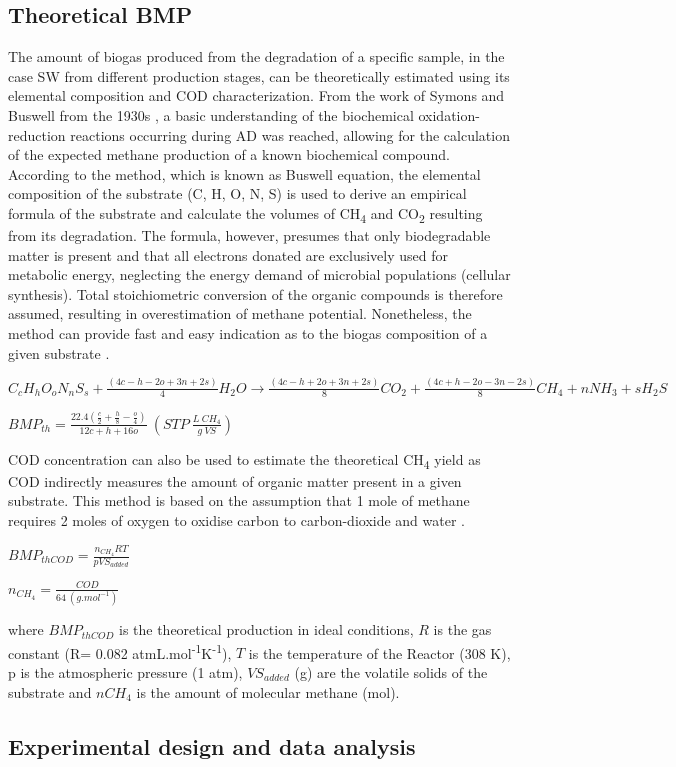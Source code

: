 \subsection{Theoretical BMP}
The amount of biogas produced from the degradation of a specific sample, in the case SW from different production stages, can be theoretically estimated using its elemental composition and COD characterization. From the work of Symons and Buswell from the 1930s \cite{Symons_1933}, a basic understanding of the biochemical oxidation-reduction reactions occurring during AD was reached, allowing for the calculation of the expected methane production of a known biochemical compound. According to the method, which is known as Buswell equation, the elemental composition of the substrate (C, H, O, N, S) is used to derive an empirical formula of the substrate and calculate the volumes of CH\textsubscript{4} and CO\textsubscript{2} resulting from its degradation. The formula, however, presumes that only biodegradable matter is present and that all electrons donated are exclusively used for metabolic energy, neglecting the energy demand of microbial populations (cellular synthesis)\cite{Labatut_2011,Lesteur_2010}. Total stoichiometric conversion of the organic compounds is therefore assumed, resulting in overestimation of methane potential. Nonetheless, the method can provide fast and easy indication as to the biogas composition of a given substrate \cite{Ware_2016}.

\(C_cH_hO_oN_nS_s+\frac{(4c-h-2o+3n+2s)}{4}H_2O→\frac{(4c-h+2o+3n+2s)}{8}CO_2+\frac{(4c+h-2o-3n-2s)}{8}CH_4+nNH_3+sH_2S\)

\(BMP_{th}=\frac{22.4\left(\frac{c}{2}+\frac{h}{8}-\frac{o}{4}\right)}{12c+h+16o}\ \left(STP\ \frac{L\ CH_4}{g\ VS}\right)\)

COD concentration can also be used to estimate the theoretical CH\textsubscript{4} yield as COD indirectly measures the amount of organic matter present in a given substrate. This method is based on the assumption that 1 mole of methane requires 2 moles of oxygen to oxidise carbon to carbon-dioxide and water \cite{Jingura_2017,Nielfa_2015}. 

\(BMP_{thCOD}=\frac{n_{CH_4}RT}{pVS_{added}}\)

\(n_{CH_4}=\frac{COD}{64\ \left(g.mol^{-1}\right)}\)

where $BMP_{thCOD}$ is the theoretical production in ideal conditions, $R$ is the gas constant (R= 0.082 atmL.mol\textsuperscript{-1}K\textsuperscript{-1}), $T$ is the temperature of the Reactor (308 K), p is the atmospheric pressure (1 atm), $VS_{added}$ (g) are the volatile solids of the substrate and $nCH_4$ is the amount of molecular methane (mol).

\subsection{Experimental design and data analysis}


